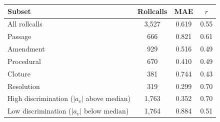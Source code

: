 \begin{tabular}{lccc}
\toprule
Subset & Rollcalls & MAE & $r$ \\
\midrule
All rollcalls & 3,527 & 0.619 & 0.55 \\
Passage & 666 & 0.821 & 0.61 \\
Amendment & 929 & 0.516 & 0.49 \\
Procedural & 670 & 0.410 & 0.49 \\
Cloture & 381 & 0.744 & 0.43 \\
Resolution & 319 & 0.299 & 0.70 \\
High discrimination ($|a_v|$ above median) & 1,763 & 0.352 & 0.70 \\
Low discrimination ($|a_v|$ below median) & 1,764 & 0.884 & 0.51 \\
\bottomrule
\end{tabular}
